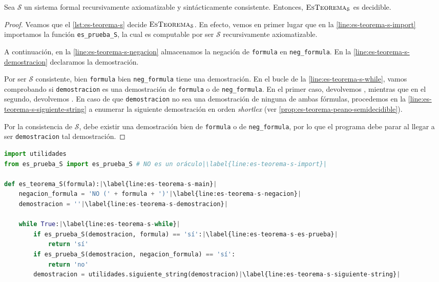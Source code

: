 \begin{proposicion}\label{prop:es-teorema-consistente-decidible}
Sea $\mathcal{S}$ un sistema formal recursivamente axiomatizable y sintácticamente consistente. Entonces, $\textsc{EsTeorema}_\mathcal{S}$ es decidible.
\end{proposicion}
\begin{proof}
Veamos que el \cref{lst:es-teorema-s} decide $\textsc{EsTeorema}_\mathcal{S}$. En efecto, vemos en primer lugar que en la \cref{line:es-teorema-s-import} importamos la función \texttt{es\_prueba\_S}, la cual es computable por ser $\mathcal{S}$ recursivamente axiomatizable.

A continuación, en la \cref{line:es-teorema-s-negacion} almacenamos la negación de \texttt{formula} en \texttt{neg\_formula}. En la \cref{line:es-teorema-s-demostracion} declaramos la demostración.

Por ser $\mathcal{S}$ consistente, bien \texttt{formula} bien \texttt{neg\_formula} tiene una demostración. En el bucle de la \cref{line:es-teorema-s-while}, vamos comprobando si \texttt{demostracion} es una demostración de \texttt{formula} o de \texttt{neg\_formula}. En el primer caso, devolvemos , mientras que en el segundo, devolvemos . En caso de que \texttt{demostracion} no sea una demostración de ninguna de ambas fórmulas, procedemos en la \cref{line:es-teorema-s-siguiente-string} a enumerar la siguiente demostración en orden \emph{shortlex} (ver \cref{prop:es-teorema-peano-semidecidible}).

Por la consistencia de $\mathcal{S}$, debe existir una demostración bien de \texttt{formula} o de \texttt{neg\_formula}, por lo que el programa debe parar al llegar a ser \texttt{demostracion} tal demostración.
\end{proof}

\vspace{8pt}

\begin{lstlisting}[language=Python, caption=\lstinline{es_teorema_S.py},label={lst:es-teorema-s}]
import utilidades
from es_prueba_S import es_prueba_S # NO es un oráculo|\label{line:es-teorema-s-import}|

def es_teorema_S(formula):|\label{line:es-teorema-s-main}|
    negacion_formula = 'NO (' + formula + ')'|\label{line:es-teorema-s-negacion}|
    demostracion = ''|\label{line:es-teorema-s-demostracion}|

    while True:|\label{line:es-teorema-s-while}|
        if es_prueba_S(demostracion, formula) == 'sí':|\label{line:es-teorema-s-es-prueba}|
            return 'sí'
        if es_prueba_S(demostracion, negacion_formula) == 'sí':
            return 'no'
        demostracion = utilidades.siguiente_string(demostracion)|\label{line:es-teorema-s-siguiente-string}|
\end{lstlisting}

